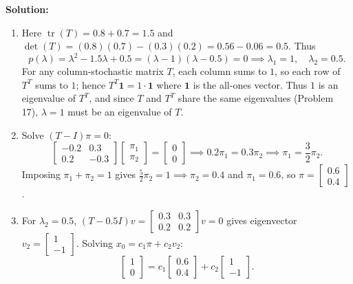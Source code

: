 \documentclass[11pt, letterpaper]{article}
\theoremstyle{definition}
\theoremstyle{remark}
\begin{document}
\textbf{Solution:}
\begin{enumerate}[label=(\alph*), topsep=3pt, itemsep=4pt]
    \item Here $\operatorname{tr}(T) = 0.8 + 0.7 = 1.5$ and $\det(T) = (0.8)(0.7) - (0.3)(0.2) = 0.56 - 0.06 = 0.5$. Thus
    \[
    p(\lambda) = \lambda^2 - 1.5\lambda + 0.5 = (\lambda - 1)(\lambda - 0.5) = 0 \implies \lambda_1 = 1, \quad \lambda_2 = 0.5.
    \]
    For any column-stochastic matrix $T$, each column sums to $1$, so each row of $T^T$ sums to $1$; hence $T^T \mathbf{1} = 1 \cdot \mathbf{1}$ where $\mathbf{1}$ is the all-ones vector. Thus $1$ is an eigenvalue of $T^T$, and since $T$ and $T^T$ share the same eigenvalues (Problem 17), $\lambda = 1$ must be an eigenvalue of $T$.
    \item Solve $(T - I)\pi = 0$:
    \[
    \begin{bmatrix} -0.2 & 0.3 \\ 0.2 & -0.3 \end{bmatrix}\begin{bmatrix} \pi_1 \\ \pi_2 \end{bmatrix} = \begin{bmatrix} 0 \\ 0 \end{bmatrix} \implies 0.2\pi_1 = 0.3\pi_2 \implies \pi_1 = \frac{3}{2}\pi_2.
    \]
    Imposing $\pi_1 + \pi_2 = 1$ gives $\frac{5}{2}\pi_2 = 1 \implies \pi_2 = 0.4$ and $\pi_1 = 0.6$, so $\pi = \begin{bmatrix} 0.6 \\ 0.4 \end{bmatrix}$.
    \item For $\lambda_2 = 0.5$, $(T - 0.5I)v = \begin{bmatrix} 0.3 & 0.3 \\ 0.2 & 0.2 \end{bmatrix}v = 0$ gives eigenvector $v_2 = \begin{bmatrix} 1 \\ -1 \end{bmatrix}$. Solving $x_0 = c_1 \pi + c_2 v_2$:
    \[
    \begin{bmatrix} 1 \\ 0 \end{bmatrix} = c_1\begin{bmatrix} 0.6 \\ 0.4 \end{bmatrix} + c_2\begin{bmatrix} 1 \\ -1 \end{bmatrix}.
\]
\end{enumerate}
\end{document}
